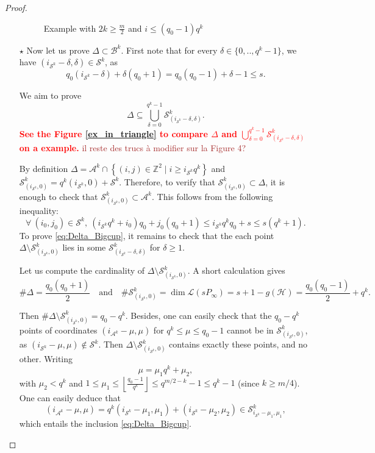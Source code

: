 \documentclass[a4paper]{article}
\newcommand{\calA}{\mathcal{A}}
\newcommand{\calB}{\mathcal{B}}
\newcommand{\calS}{\mathcal{S}}
\newcommand{\calH}{\mathcal{H}}
\newcommand{\calL}{\mathcal{L}}
\newcommand{\Z}{\mathbb{Z}}
\newcommand\mathieu[1]{\textcolor{brown}{#1}}
\newcommand{\modifier}[1]{\textcolor{red}{\textbf{#1}}}
\begin{document}
\begin{proof}
\begin{itemize}
\begin{figure}[ht]
\centering

\caption{Example with $2k \geq \frac{m}{2}$ and $i \leq (q_0-1)q^k$} \label{ex_in_rectangle}
\end{figure}

 \item[$\star$] Now let us prove $\Delta \subset \calB^k$. First note that for every $\delta \in \{0,..,q^k-1\}$, we have $(i_{\calS^k}-\delta,\delta) \in \calS^k$, as 
  \[q_0(i_{\calS^k}-\delta) + \delta(q_0+1) = q_0(q_0-1)+\delta-1 \leq s.\]
 
 We aim to prove
 \begin{equation} \label{eq:Delta_Bigcup}
 \Delta \subseteq \bigcup_{\delta=0}^{q^k-1} \calS^k_{(i_{\calS^k}-\delta,\delta)}.
 \end{equation}
\modifier{See the Figure \ref{ex_in_triangle} to compare $\Delta$ and $\bigcup_{\delta=0}^{q^k-1} \calS^k_{(i_{\calS^k}-\delta,\delta)}$ on a example.}
\mathieu{il reste des trucs à modifier sur la Figure 4?}

By definition $\Delta = \calA^k \cap \left\{(i,j)\in \Z^2 \mid i \geq i_{\calS^k}q^k\right\}$ and $\calS^k_{(i_{\calS^k},0)}=q^k(i_{\calS^k},0)+\calS^k$.
Therefore, to verify that $\calS^k_{(i_{\calS^k},0)} \subset \Delta$, it is enough to check that $\calS^k_{(i_{\calS^k},0)} \subset \calA^k$. This follows from the following inequality:
\[\forall \: (i_0,j_0) \in \calS^k, \: (i_{\calS^k}q^k+i_0)q_0+j_0(q_0+1)\leq i_{\calS^k}q^kq_0+s \leq s(q^k+1).\]
To prove \eqref{eq:Delta_Bigcup}, it remains to check that the each point
$\Delta \setminus  \calS^k_{(i_{\calS^k},0)}$ lies in some $\calS^k_{(i_{\calS^k}-\delta,\delta)}$ for $\delta\geq 1$.

Let us compute the cardinality of $\Delta \setminus  \calS^k_{(i_{\calS^k},0)}$. A short calculation gives
 \[ \# \Delta = \dfrac{q_0(q_0+1)}{2} \quad \mathrm{and} \quad \# \calS^k_{(i_{\calS^k},0)} = \dim \calL(sP_{\infty}) = s+1-g(\calH) = \dfrac{q_0(q_0-1)}{2} + q^k.\]

Then $\# \Delta \setminus  \calS^k_{(i_{\calS^k},0)}=q_0-q^k$. Besides, one can easily check that the $q_0-q^k$ points of coordinates $(i_{\calA^k}-\mu,\mu)$ for $q^k \leq \mu \leq q_0-1$ cannot be in $\calS^k_{(i_{\calS^k},0)}$, as $(i_{\calS^k}-\mu,\mu) \notin \calS^k$. Then $\Delta \setminus  \calS^k_{(i_{\calS^k},0)}$ contains exactly these points, and no other. Writing
 \[ \mu = \mu_1q^k + \mu_2,\]
 with $\mu_2 < q^k$ and $1 \leq \mu_1 \leq \left\lfloor\frac{q_0-1}{q^k}\right\rfloor \leq q^{m/2-k}-1 \leq q^k-1$ (since $k \geq m/4$). One can easily deduce that
 \[(i_{\calA^k}-\mu,\mu)=q^k(i_{\calS^k}-\mu_1,\mu_1)+(i_{\calS^k}-\mu_2,\mu_2) \in \calS^k_{i_{\calS^k}-\mu_1,\mu_1},\]
 which entails the inclusion \eqref{eq:Delta_Bigcup}.



\end{itemize}
\end{proof}
\end{document}
